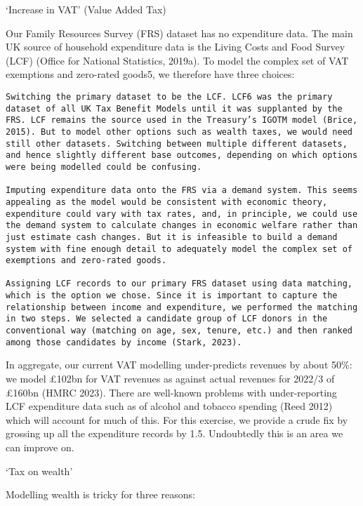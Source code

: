 \documentclass[
  letterpaper,
  DIV=11,
  numbers=noendperiod]{scrartcl}
\begin{document}
`Increase in VAT' (Value Added Tax)

Our Family Resources Survey (FRS) dataset has no expenditure data. The
main UK source of household expenditure data is the Living Costs and
Food Survey (LCF) (Office for National Statistics, 2019a). To model the
complex set of VAT exemptions and zero-rated goods5, we therefore have
three choices:

\begin{verbatim}
Switching the primary dataset to be the LCF. LCF6 was the primary dataset of all UK Tax Benefit Models until it was supplanted by the FRS. LCF remains the source used in the Treasury’s IGOTM model (Brice, 2015). But to model other options such as wealth taxes, we would need still other datasets. Switching between multiple different datasets, and hence slightly different base outcomes, depending on which options were being modelled could be confusing. 

Imputing expenditure data onto the FRS via a demand system. This seems appealing as the model would be consistent with economic theory, expenditure could vary with tax rates, and, in principle, we could use the demand system to calculate changes in economic welfare rather than just estimate cash changes. But it is infeasible to build a demand system with fine enough detail to adequately model the complex set of exemptions and zero-rated goods.  

Assigning LCF records to our primary FRS dataset using data matching, which is the option we chose. Since it is important to capture the relationship between income and expenditure, we performed the matching in two steps. We selected a candidate group of LCF donors in the conventional way (matching on age, sex, tenure, etc.) and then ranked among those candidates by income (Stark, 2023). 
\end{verbatim}

In aggregate, our current VAT modelling under-predicts revenues by about
50\%: we model £102bn for VAT revenues as against actual revenues for
2022/3 of £160bn (HMRC 2023). There are well-known problems with
under-reporting LCF expenditure data such as of alcohol and tobacco
spending (Reed 2012) which will account for much of this. For this
exercise, we provide a crude fix by grossing up all the expenditure
records by 1.5. Undoubtedly this is an area we can improve on.

`Tax on wealth'

Modelling wealth is tricky for three reasons:
\end{document}
